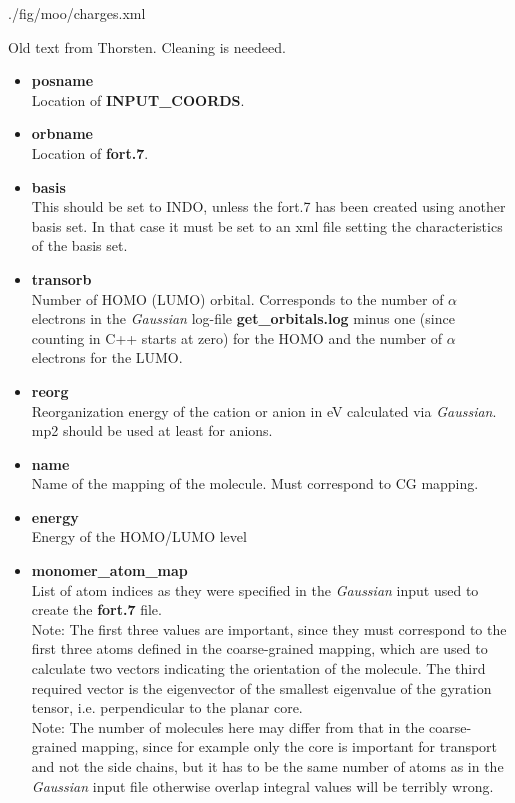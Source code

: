 %
{./fig/moo/charges.xml}


{\color{red} Old text from Thorsten. Cleaning is needeed.}



\begin{itemize}
 \item {\bf posname} \\
 Location of {\bf INPUT\_COORDS}.
 \item {\bf orbname} \\
 Location of {\bf fort.7}.
 \item{\bf basis} \\
 This should be set to INDO, unless the fort.7 has been created using another basis set. In that case it must be set to an xml file setting the characteristics of the basis set.
 \item {\bf transorb} \\
 Number of HOMO (LUMO) orbital. Corresponds to the number of $\alpha$ electrons in the \emph{Gaussian} log-file {\bf get\_orbitals.log} minus one (since counting in C++ starts at zero) for the HOMO and the number of $\alpha$ electrons for the LUMO.
 \item {\bf reorg} \\
 Reorganization energy of the cation or anion in eV calculated via \emph{Gaussian}. mp2 should be used at least for anions.
 \item {\bf name} \\
 Name of the mapping of the molecule. Must correspond to CG mapping.
 \item {\bf energy} \\
 Energy of the HOMO/LUMO level
 \item {\bf monomer\_atom\_map} \\
 List of atom indices as they were specified in the \emph{Gaussian} input used to create the {\bf fort.7} file. \\
 Note: The first three values are important, since they must correspond to the first three atoms defined in the coarse-grained mapping, which are used to calculate two vectors indicating the orientation of the molecule. The third required vector is the eigenvector of the smallest eigenvalue of the gyration tensor, i.e. perpendicular to the planar core. \\
 Note: The number of molecules here may differ from that in the coarse-grained mapping, since for example only the core is important for transport and not the side chains, but it has to be the same number of atoms as in the \emph{Gaussian} input file otherwise overlap integral values will be terribly wrong.
\end{itemize}
